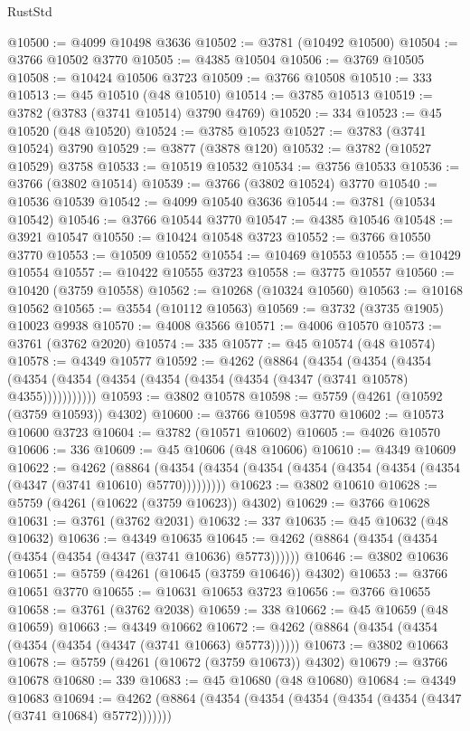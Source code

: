 \begin{lexlean}{RustStd}
\begin{coremodule}
@10500 := @4099 @10498 @3636
@10502 := @3781 (@10492 @10500)
@10504 := @3766 @10502 @3770
@10505 := @4385 @10504
@10506 := @3769 @10505
@10508 := @10424 @10506 @3723
@10509 := @3766 @10508
@10510 := 333
@10513 := @45 @10510 (@48 @10510)
@10514 := @3785 @10513
@10519 := @3782 (@3783 (@3741 @10514) @3790 @4769)
@10520 := 334
@10523 := @45 @10520 (@48 @10520)
@10524 := @3785 @10523
@10527 := @3783 (@3741 @10524) @3790
@10529 := @3877 (@3878 @120)
@10532 := @3782 (@10527 @10529) @3758
@10533 := @10519 @10532
@10534 := @3756 @10533
@10536 := @3766 (@3802 @10514)
@10539 := @3766 (@3802 @10524) @3770
@10540 := @10536 @10539
@10542 := @4099 @10540 @3636
@10544 := @3781 (@10534 @10542)
@10546 := @3766 @10544 @3770
@10547 := @4385 @10546
@10548 := @3921 @10547
@10550 := @10424 @10548 @3723
@10552 := @3766 @10550 @3770
@10553 := @10509 @10552
@10554 := @10469 @10553
@10555 := @10429 @10554
@10557 := @10422 @10555 @3723
@10558 := @3775 @10557
@10560 := @10420 (@3759 @10558)
@10562 := @10268 (@10324 @10560)
@10563 := @10168 @10562
@10565 := @3554 (@10112 @10563)
@10569 := @3732 (@3735 @1905) @10023 @9938
@10570 := @4008 @3566
@10571 := @4006 @10570
@10573 := @3761 (@3762 @2020)
@10574 := 335
@10577 := @45 @10574 (@48 @10574)
@10578 := @4349 @10577
@10592 := @4262
    (@8864
      (@4354
        (@4354
          (@4354 (@4354 (@4354 (@4354 (@4354 (@4354 (@4354 (@4347 (@3741 @10578) @4355)))))))))))
@10593 := @3802 @10578
@10598 := @5759 (@4261 (@10592 (@3759 @10593)) @4302)
@10600 := @3766 @10598 @3770
@10602 := @10573 @10600 @3723
@10604 := @3782 (@10571 @10602)
@10605 := @4026 @10570
@10606 := 336
@10609 := @45 @10606 (@48 @10606)
@10610 := @4349 @10609
@10622 := @4262
    (@8864 (@4354 (@4354 (@4354 (@4354 (@4354 (@4354 (@4354 (@4347 (@3741 @10610) @5770)))))))))
@10623 := @3802 @10610
@10628 := @5759 (@4261 (@10622 (@3759 @10623)) @4302)
@10629 := @3766 @10628
@10631 := @3761 (@3762 @2031)
@10632 := 337
@10635 := @45 @10632 (@48 @10632)
@10636 := @4349 @10635
@10645 := @4262 (@8864 (@4354 (@4354 (@4354 (@4354 (@4347 (@3741 @10636) @5773))))))
@10646 := @3802 @10636
@10651 := @5759 (@4261 (@10645 (@3759 @10646)) @4302)
@10653 := @3766 @10651 @3770
@10655 := @10631 @10653 @3723
@10656 := @3766 @10655
@10658 := @3761 (@3762 @2038)
@10659 := 338
@10662 := @45 @10659 (@48 @10659)
@10663 := @4349 @10662
@10672 := @4262 (@8864 (@4354 (@4354 (@4354 (@4354 (@4347 (@3741 @10663) @5773))))))
@10673 := @3802 @10663
@10678 := @5759 (@4261 (@10672 (@3759 @10673)) @4302)
@10679 := @3766 @10678
@10680 := 339
@10683 := @45 @10680 (@48 @10680)
@10684 := @4349 @10683
@10694 := @4262 (@8864 (@4354 (@4354 (@4354 (@4354 (@4354 (@4347 (@3741 @10684) @5772)))))))

\end{coremodule}
\end{lexlean}
